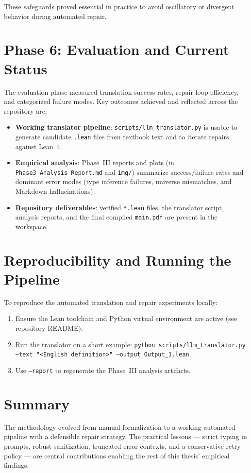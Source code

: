 These safeguards proved essential in practice to avoid oscillatory or divergent behavior during automated repair.

\section{Phase 6: Evaluation and Current Status}
\label{sec:phase6-eval}

The evaluation phase measured translation success rates, repair-loop efficiency, and categorized failure modes. Key outcomes achieved and reflected across the repository are:

\begin{itemize}
    \item \textbf{Working translator pipeline}: \texttt{scripts/llm\_translator.py} is usable to generate candidate \texttt{.lean} files from textbook text and to iterate repairs against Lean~4.
    \item \textbf{Empirical analysis}: Phase~III reports and plots (in \texttt{Phase3\_Analysis\_Report.md} and \texttt{img/}) summarize success/failure rates and dominant error modes (type inference failures, universe mismatches, and Markdown hallucinations).
    \item \textbf{Repository deliverables}: verified \texttt{*.lean} files, the translator script, analysis reports, and the final compiled \texttt{main.pdf} are present in the workspace.
\end{itemize}

\section{Reproducibility and Running the Pipeline}
\label{sec:repro}

To reproduce the automated translation and repair experiments locally:

\begin{enumerate}
    \item Ensure the Lean toolchain and Python virtual environment are active (see repository README).
    \item Run the translator on a short example: \texttt{python scripts/llm\_translator.py --text "<English definition>" --output Output\_1.lean}.
    \item Use \texttt{--report} to regenerate the Phase~III analysis artifacts.
\end{enumerate}

\section{Summary}

The methodology evolved from manual formalization to a working automated pipeline with a defensible repair strategy. The practical lessons — strict typing in prompts, robust sanitization, truncated error contexts, and a conservative retry policy — are central contributions enabling the rest of this thesis' empirical findings.

